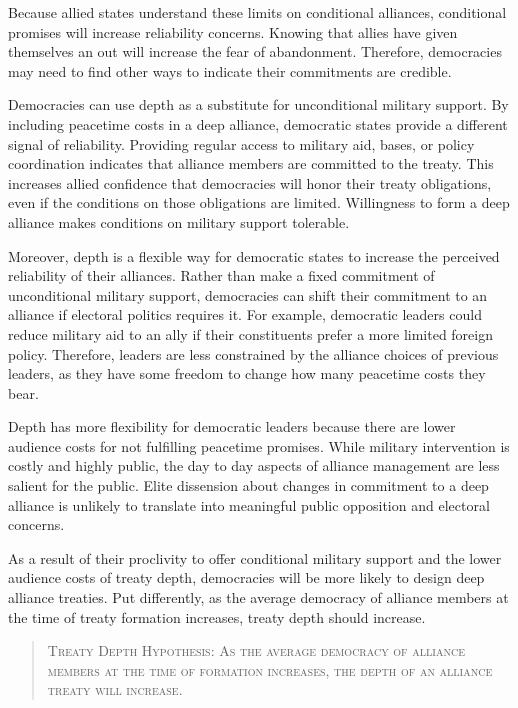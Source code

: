 \documentclass[12pt]{article}
\begin{document}
Because allied states understand these limits on conditional alliances, conditional promises will increase reliability concerns. 
Knowing that allies have given themselves an out will increase the fear of abandonment. 
Therefore, democracies may need to find other ways to indicate their commitments are credible. 


Democracies can use depth as a substitute for unconditional military support. 
By including peacetime costs in a deep alliance, democratic states provide a different signal of reliability. 
Providing regular access to military aid, bases, or policy coordination indicates that alliance members are committed to the treaty. 
This increases allied confidence that democracies will honor their treaty obligations, even if the conditions on those obligations are limited. 
Willingness to form a deep alliance makes conditions on military support tolerable. 


Moreover, depth is a flexible way for democratic states to increase the perceived reliability of their alliances. 
Rather than make a fixed commitment of unconditional military support, democracies can shift their commitment to an alliance if electoral politics requires it.
For example, democratic leaders could reduce military aid to an ally if their constituents prefer a more limited foreign policy.  
Therefore, leaders are less constrained by the alliance choices of previous leaders, as they have some freedom to change how many peacetime costs they bear. 


Depth has more flexibility for democratic leaders because there are lower audience costs for not fulfilling peacetime promises. 
While military intervention is costly and highly public, the day to day aspects of alliance management are less salient for the public. 
Elite dissension about changes in commitment to a deep alliance is unlikely to translate into meaningful public opposition and electoral concerns. 


As a result of their proclivity to offer conditional military support and the lower audience costs of treaty depth, democracies will be more likely to design deep alliance treaties. 
Put differently, as the average democracy of alliance members at the time of treaty formation increases, treaty depth should increase. 


\begin{quote}
\textsc{Treaty Depth Hypothesis: As the average democracy of alliance members at the time of formation increases, the depth of an alliance treaty will increase.}
\end{quote} 
\end{document}
